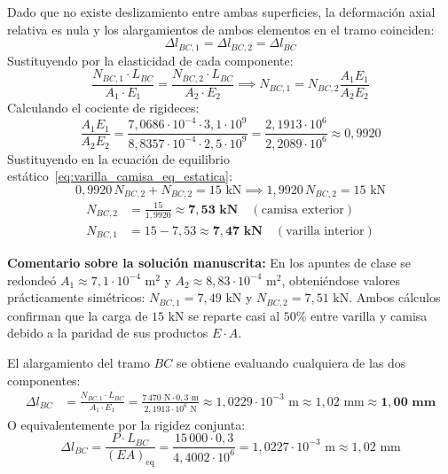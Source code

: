 Dado que no existe deslizamiento entre ambas superficies, la deformación axial relativa es nula y los alargamientos de ambos elementos en el tramo coinciden:
\begin{equation}
    \Delta l_{BC,1} = \Delta l_{BC,2} = \Delta l_{BC} \label{eq:varilla_camisa_compatibilidad}
\end{equation}
Sustituyendo por la elasticidad de cada componente:
\begin{equation}
    \frac{N_{BC,1} \cdot L_{BC}}{A_1 \cdot E_1} = \frac{N_{BC,2} \cdot L_{BC}}{A_2 \cdot E_2} \implies N_{BC,1} = N_{BC,2} \frac{A_1 E_1}{A_2 E_2}
\end{equation}
Calculando el cociente de rigideces:
\begin{equation}
    \frac{A_1 E_1}{A_2 E_2} = \frac{7{,}0686 \cdot 10^{-4} \cdot 3{,}1 \cdot 10^9}{8{,}8357 \cdot 10^{-4} \cdot 2{,}5 \cdot 10^9} = \frac{2{,}1913 \cdot 10^6}{2{,}2089 \cdot 10^6} \approx 0{,}9920
\end{equation}
Sustituyendo en la ecuación de equilibrio estático~\eqref{eq:varilla_camisa_eq_estatica}:
\begin{equation}
    0{,}9920\, N_{BC,2} + N_{BC,2} = 15\text{ kN} \implies 1{,}9920\, N_{BC,2} = 15\text{ kN}
\end{equation}
\begin{align}
    N_{BC,2} &= \frac{15}{1{,}9920} \approx \mathbf{7{,}53\text{ kN}} \quad (\text{camisa exterior}) \\
    N_{BC,1} &= 15 - 7{,}53 \approx \mathbf{7{,}47\text{ kN}} \quad (\text{varilla interior})
\end{align}
\begin{tcolorbox}[colback=blue!5!white, colframe=blue!60!black, arc=3pt, boxrule=0.7pt]
    \small \textbf{Comentario sobre la solución manuscrita:}
    En los apuntes de clase se redondeó $A_1 \approx 7{,}1 \cdot 10^{-4}\text{ m}^2$ y $A_2 \approx 8{,}83 \cdot 10^{-4}\text{ m}^2$, obteniéndose valores prácticamente simétricos: $N_{BC,1} = 7{,}49\text{ kN}$ y $N_{BC,2} = 7{,}51\text{ kN}$. Ambos cálculos confirman que la carga de $15\text{ kN}$ se reparte casi al $50\%$ entre varilla y camisa debido a la paridad de sus productos $E \cdot A$.
\end{tcolorbox}

El alargamiento del tramo $BC$ se obtiene evaluando cualquiera de las dos componentes:
\begin{align}
    \Delta l_{BC} &= \frac{N_{BC,1} \cdot L_{BC}}{A_1 \cdot E_1} = \frac{7\,470\text{ N} \cdot 0{,}3\text{ m}}{2{,}1913 \cdot 10^6\text{ N}} \approx 1{,}0229 \cdot 10^{-3}\text{ m} \approx 1{,}02\text{ mm} \approx \mathbf{1{,}00\text{ mm}}
\end{align}
O equivalentemente por la rigidez conjunta:
\begin{equation}
    \Delta l_{BC} = \frac{P \cdot L_{BC}}{(EA)_{\text{eq}}} = \frac{15\,000 \cdot 0{,}3}{4{,}4002 \cdot 10^6} = 1{,}0227 \cdot 10^{-3}\text{ m} \approx 1{,}02\text{ mm}
\end{equation}

